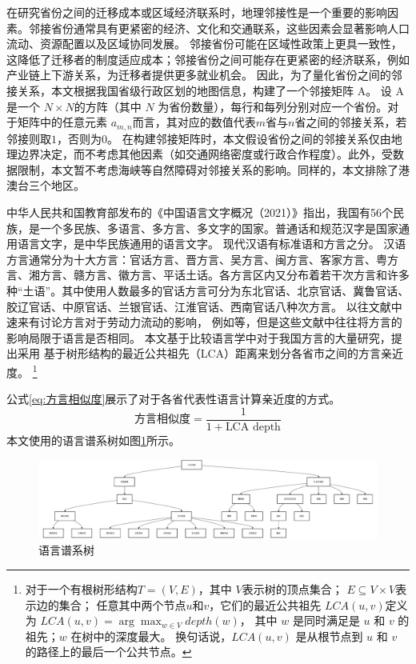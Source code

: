 \documentclass[a4paper, zihao=-4, fontset = mac, oneside]{ctexbook} %
\let\oldfootnote\footnote
\renewcommand{\footnote}[1]{%
  \oldfootnote{\setstretch{1.5}#1}%
}
\begin{document}
在研究省份之间的迁移成本或区域经济联系时，地理邻接性是一个重要的影响因素。邻接省份通常具有更紧密的经济、文化和交通联系，这些因素会显著影响人口流动、资源配置以及区域协同发展。
邻接省份可能在区域性政策上更具一致性，这降低了迁移者的制度适应成本；邻接省份之间可能存在更紧密的经济联系，例如产业链上下游关系，为迁移者提供更多就业机会。
因此，为了量化省份之间的邻接关系，本文根据我国省级行政区划的地图信息，构建了一个邻接矩阵 A。
设 A 是一个 $N \times N$的方阵（其中 $N$ 为省份数量），每行和每列分别对应一个省份。对于矩阵中的任意元素 $a_{m,n}$而言，其对应的数值代表$m$省与$n$省之间的邻接关系，若邻接则取$1$，否则为$0$。
在构建邻接矩阵时，本文假设省份之间的邻接关系仅由地理边界决定，而不考虑其他因素（如交通网络密度或行政合作程度）。此外，受数据限制，本文暂不考虑海峡等自然障碍对邻接关系的影响。同样的，本文排除了港澳台三个地区。

中华人民共和国教育部发布的《中国语言文字概况（2021）》指出，我国有56个民族，是一个多民族、多语言、多方言、多文字的国家。普通话和规范汉字是国家通用语言文字，是中华民族通用的语言文字。
现代汉语有标准语和方言之分。
汉语方言通常分为十大方言：官话方言、晋方言、吴方言、闽方言、客家方言、粤方言、湘方言、赣方言、徽方言、平话土话。各方言区内又分布着若干次方言和许多种“土语”。其中使用人数最多的官话方言可分为东北官话、北京官话、冀鲁官话、胶辽官话、中原官话、兰银官话、江淮官话、西南官话八种次方言。
以往文献中速来有讨论方言对于劳动力流动的影响，
例如\textcite{HuangZongYeFangYanDuiShengJiRenKouQianYiDeYingXiang2020,LiQinFangYanPuTongHuaYuZhongGuoLaoDongLiQuYuLiuDong2014}等，但是这些文献中往往将方言的影响局限于语言是否相同。
本文基于比较语言学中对于我国方言的大量研究，提出采用
基于树形结构的最近公共祖先（LCA）距离来划分各省市之间的方言亲近度。
\footnote{
对于一个有根树形结构$T=(V,E)$，其中
$V$表示树的顶点集合；
$E\subseteq V \times V$表示边的集合；
任意其中两个节点$u$和$v$，它们的最近公共祖先 $LCA(u,v) $定义为
$LCA(u,v)=\arg \max_{w\in V} depth(w)$，
其中 $w$ 是同时满足是 $u$ 和 $v$ 的祖先；$w$ 在树中的深度最大。
换句话说，$LCA(u,v)$ 是从根节点到 $u$ 和 $v$ 的路径上的最后一个公共节点。
}
公式\ref{eq:方言相似度}展示了对于各省代表性语言计算亲近度的方式。
\begin{equation}
  \label{eq:方言相似度}
  \text{方言相似度}=\frac{1}{1+\text{LCA depth}}
\end{equation}
本文使用的语言谱系树如图\ref{fig:linguistic_tree}所示。
\begin{figure}[!ht]
\centering
\caption{语言谱系树}
\label{fig:linguistic_tree}
\includegraphics[width=\textwidth]{images/linguisitc_tree.drawio.pdf}
\end{figure}
\end{document}
